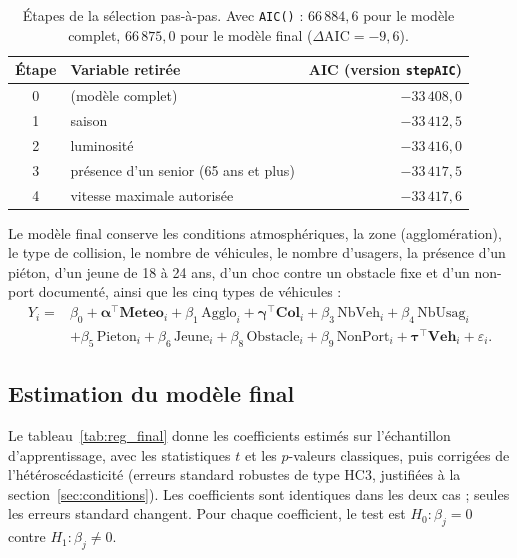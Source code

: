 \documentclass[11pt,a4paper]{article}
\begin{document}
\begin{table}[H]
\centering
\small
\begin{tabular}{clr}
\toprule
\textbf{Étape} & \textbf{Variable retirée} & \textbf{AIC (version \texttt{stepAIC})} \\
\midrule
0 & (modèle complet) & $-33\,408{,}0$ \\
1 & saison & $-33\,412{,}5$ \\
2 & luminosité & $-33\,416{,}0$ \\
3 & présence d'un senior (65 ans et plus) & $-33\,417{,}5$ \\
4 & vitesse maximale autorisée & $-33\,417{,}6$ \\
\bottomrule
\end{tabular}
\caption{Étapes de la sélection pas-à-pas. Avec \texttt{AIC()} : $66\,884{,}6$ pour le modèle complet, $66\,875{,}0$ pour le modèle final ($\Delta\text{AIC} = -9{,}6$).}
\label{tab:stepaic}
\end{table}

Le modèle final conserve les conditions atmosphériques, la zone (agglomération), le type de collision, le nombre de véhicules, le nombre d'usagers, la présence d'un piéton, d'un jeune de 18 à 24 ans, d'un choc contre un obstacle fixe et d'un non-port documenté, ainsi que les cinq types de véhicules :
\begin{equation}
\begin{split}
Y_i ={}& \beta_0 + \boldsymbol{\alpha}^{\top}\mathbf{Meteo}_i + \beta_1\,\mathrm{Agglo}_i + \boldsymbol{\gamma}^{\top}\mathbf{Col}_i + \beta_3\,\mathrm{NbVeh}_i + \beta_4\,\mathrm{NbUsag}_i \\
&+ \beta_5\,\mathrm{Pieton}_i + \beta_6\,\mathrm{Jeune}_i + \beta_8\,\mathrm{Obstacle}_i + \beta_9\,\mathrm{NonPort}_i + \boldsymbol{\tau}^{\top}\mathbf{Veh}_i + \varepsilon_i .
\end{split}
\end{equation}

\subsection{Estimation du modèle final}
Le tableau~\ref{tab:reg_final} donne les coefficients estimés sur l'échantillon d'apprentissage, avec les statistiques $t$ et les $p$-valeurs classiques, puis corrigées de l'hétéroscédasticité (erreurs standard robustes de type HC3, justifiées à la section~\ref{sec:conditions}). Les coefficients sont identiques dans les deux cas ; seules les erreurs standard changent. Pour chaque coefficient, le test est $H_0 : \beta_j = 0$ contre $H_1 : \beta_j \neq 0$.
\end{document}

